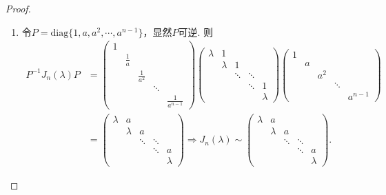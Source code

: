 \documentclass[../../main.tex]{subfiles}
\begin{document}
\begin{proof}
\begin{enumerate}[(1)]
\item 令$P = \mathrm{diag}\{1, a, a^2, \cdots, a^{n-1}\}$，显然$P$可逆. 则
\begin{align*}
P^{-1}J_n(\lambda)P &= \begin{pmatrix}
1 & & & & \\
& \frac{1}{a} & & & \\
& & \frac{1}{a^2} & & \\
& & & \ddots & \\
& & & & \frac{1}{a^{n-1}}
\end{pmatrix} \begin{pmatrix}
\lambda & 1 & & & \\
& \lambda & 1 & & \\
& & \ddots & \ddots & \\
& & & \ddots & 1 \\
& & & & \lambda
\end{pmatrix} \begin{pmatrix}
1 & & & & \\
& a & & & \\
& & a^2 & & \\
& & & \ddots & \\
& & & & a^{n-1}
\end{pmatrix} \\
&= \begin{pmatrix}
\lambda & a & & & \\
& \lambda & a & & \\
& & \ddots & \ddots & \\
& & & \ddots & a \\
& & & & \lambda
\end{pmatrix} \Longrightarrow J_n(\lambda) \sim \begin{pmatrix}
\lambda & a & & & \\
& \lambda & a & & \\
& & \ddots & \ddots & \\
& & & \ddots & a \\
& & & & \lambda
\end{pmatrix}.
\end{align*}

\end{enumerate}

\end{proof}
\end{document}
